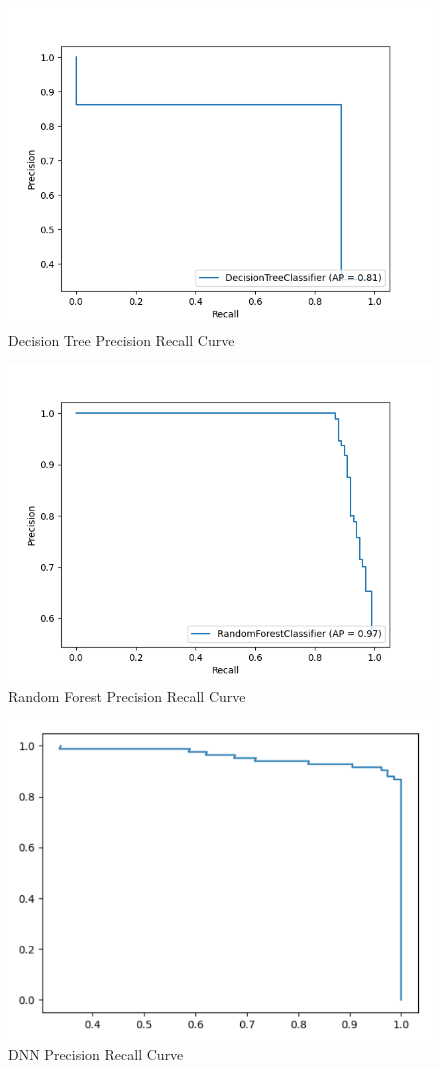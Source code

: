 \documentclass{../../Latex_Template/Homework/homework}
\begin{document}
\begin{alphaparts}
    \begin{figure}[h]
      \centering
      \includegraphics[width=0.5\linewidth]{DST_PRC.png}
      \caption{Decision Tree Precision Recall Curve}
      \label{fig:DST_PRC}
    \end{figure}
    
    \begin{figure}[h]
      \centering
      \includegraphics[width=0.5\linewidth]{RF_PRC.png}
      \caption{Random Forest Precision Recall Curve}
      \label{fig:RF_PRC}
    \end{figure}

    \begin{figure}[h]
      \centering
      \includegraphics[width=0.5\linewidth]{DNN_PRC.png}
      \caption{DNN Precision Recall Curve}
      \label{fig:DNN_PRC}
    \end{figure}
    
    \pagebreak
  \end{alphaparts}
    
\end{document}
